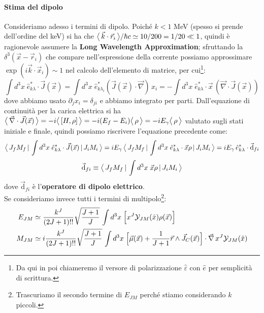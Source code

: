 \paragraph{Stima del dipolo} Consideriamo adesso i termini di dipolo. Poiché $k< 1$ MeV (spesso si prende dell'ordine del keV) si ha che $\bigl\langle\, \vec{k}\cdot\vec{r}_i\, \bigr\rangle/\hbar c\simeq 10/200 = 1/20\ll 1$, quindi è ragionevole assumere la \textbf{Long Wavelength Approximation}; sfruttando la $\delta^3(\vec{x}-\vec{r}_i)$ che compare nell'espressione della corrente possiamo approssimare $\exp{(i\vec{k}\cdot\vec{x}_i)}\sim 1$ nel calcolo dell'elemento di matrice, per cui\footnote{Da qui in poi chiameremo il versore di polarizzazione $\widehat{\varepsilon}$ con $\hat{e}$ per semplicità di scrittura.}:
$$\int d^3x\; \hat{e}_{k\lambda}^* \cdot \vec{J}(\vec{x}) = \int d^3x\; \hat{e}_{k\lambda_i}^*  (\vec{J}(\vec{x})\cdot \vec{\nabla})\,x_i = - \int d^3x \; \hat{e}_{k\lambda}^* \cdot \vec{x}\, (\vec{\nabla}\cdot\vec{J}(\vec{x})) $$
dove abbiamo usato $\partial_j x_i = \delta_{ji}$ e abbiamo integrato per parti. Dall'equazione di continuità per la carica elettrica si ha $\bigl\langle\, \vec{\nabla}\cdot\vec{J}(\vec{x})\, \bigr\rangle = -i\bigl\langle\, [H,\rho]\, \bigr\rangle = -i(E_f-E_i)\bigl\langle\, \rho\, \bigr\rangle = -i E_\gamma \bigl\langle\, \rho\, \bigr\rangle$  valutato sugli stati iniziale e finale, quindi possiamo riscrivere l'equazione precedente come:
$$\bigl\langle\, J_fM_f\, |\,\int d^3x \; \hat{e}^*_{k\lambda}\cdot \vec{J}(\vec{x})\, |\,J_iM_i\, \bigr\rangle = iE_\gamma \, \bigl\langle\, J_fM_f\, |\,\int d^3x \; \hat{e}^*_{k\lambda}\cdot \vec{x}\rho\, |\,J_iM_i\, \bigr\rangle = i E_\gamma \, \hat{e}^*_{k\lambda} \cdot \vec{\mathrm{d}}_{fi}$$
$$\vec{\mathrm{d}}_{fi} \equiv \bigl\langle\, J_fM_f\, |\,\int d^3x \; \vec{x}\rho\, |\,J_iM_i\, \bigr\rangle$$
dove $\vec{\mathrm{d}}_{fi}$ è l'\textbf{operatore di dipolo elettrico}.\\
Se consideriamo invece tutti i termini di multipolo\footnote{Trascuriamo il secondo termine di $E_{JM}$ perché stiamo considerando $k$ piccoli.}:
\begin{displaymath}
\begin{aligned}
E_{JM} &\simeq \frac{k^J}{(2J+1)!!} \sqrt{\frac{J+1}{J}}\, \int d^3x \; \Bigl [ x^J \mathcal{Y}_{JM}(\hat{x})\rho(\vec{x}) \Bigr ] \\
M_{JM} &\simeq i\frac{k^J}{(2J+1)!!} \sqrt{\frac{J+1}{J}}\, \int d^3x \; \Bigl [ \vec{\mu}(\vec{x}) + \frac{1}{J+1} \vec{r}\land \vec{J}_C(\vec{x}) \Bigr ]\cdot \vec{\nabla}\,x^J\mathcal{Y}_{JM}(\hat{x})
\end{aligned}
\end{displaymath}
